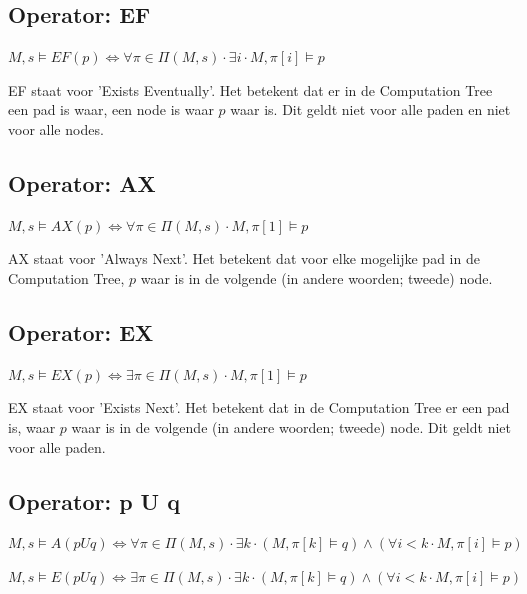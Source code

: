 \documentclass{article}
\begin{document}
		\subsection{Operator: EF}
				
		\( M, s \models EF(p) \iff \forall \pi \in \Pi (M, s) \cdot \exists i \cdot M, \pi [i] \models p\)

		EF staat voor 'Exists Eventually'. Het betekent dat er in de Computation Tree een pad is waar, een node is waar \( p \) waar is. Dit geldt niet voor alle paden en niet voor alle nodes.
		
		\subsection{Operator: AX}
				
		\( M, s \models AX(p) \iff \forall \pi \in \Pi (M, s) \cdot M, \pi [1] \models p\)

		AX staat voor 'Always Next'. Het betekent dat voor elke mogelijke pad in de Computation Tree, \( p \) waar is in de volgende (in andere woorden; tweede) node. 
		
		\subsection{Operator: EX}
				
		\( M, s \models EX(p) \iff \exists \pi \in \Pi (M, s) \cdot M, \pi [1] \models p\)

		EX staat voor 'Exists Next'. Het betekent dat in de Computation Tree er een pad is, waar \( p \) waar is in de volgende (in andere woorden; tweede) node. Dit geldt niet voor alle paden.
		
		\subsection{Operator: p U q}
				
		\( M, s \models A(pUq) \iff \forall \pi \in \Pi (M, s) \cdot \exists k \cdot (M, \pi [k] \models q) \land (\forall i < k \cdot M, \pi[i] \models p)\)

		\( M, s \models E(pUq) \iff \exists \pi \in \Pi (M, s) \cdot \exists k \cdot (M, \pi [k] \models q) \land (\forall i < k \cdot M, \pi[i] \models p)\)
\end{document}
